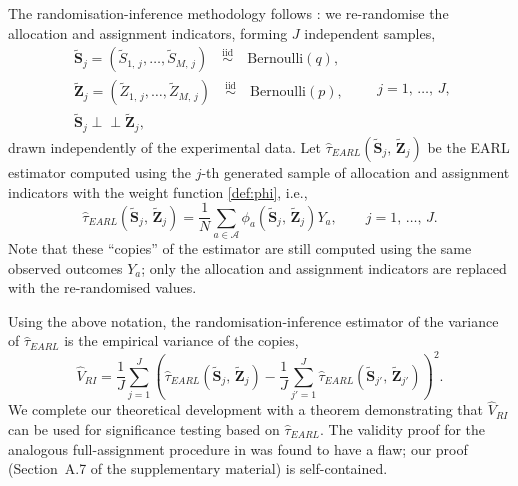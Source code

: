 \documentclass[sigconf,anonymous,review]{acmart}
\newcommand{\iidsim}{{\stackrel{\mathrm{iid}}{\sim}}}
\newcommand{\ind}{\perp\!\!\!\perp}
\begin{document}
The randomisation-inference methodology follows \cite[Section~4]{shi2025scalableanalysisbipartiteexperiments}: we re-randomise the allocation and assignment indicators, forming $J$ independent samples,
\begin{equation}\label{def:S-Z-samples}
    \begin{array}{c}
        \tilde{\mathbf{S}}_j = (\tilde S_{1,\,j},\ldots,\tilde S_{M,\,j}) \quad \iidsim \quad \mathrm{Bernoulli}(q),\\
        \tilde{\mathbf Z}_j = (\tilde Z_{1,\,j},\ldots,\tilde Z_{M,\,j}) \quad \iidsim \quad \mathrm{Bernoulli}(p),\\
        \tilde{\mathbf{S}}_j\ind \tilde{\mathbf Z}_j,
    \end{array}\qquad j=1,\,\ldots,\,J,
\end{equation}
drawn independently of the experimental data. Let $\hat\tau^{\phantom{1}}_{EARL}(\tilde {\mathbf S}_j,\,\tilde{\mathbf Z}_j)$ be the EARL estimator computed using the $j$-th generated sample of allocation and assignment indicators with the weight function \eqref{def:phi}, i.e.,
$$
    \hat\tau^{\phantom{1}}_{EARL}(\tilde {\mathbf S}_j,\,\tilde{\mathbf Z}_j) = \frac 1 N \sum_{a\in\mathcal{A}}\phi_a(\tilde {\mathbf S}_j,\,\tilde{\mathbf Z}_j)Y_a,\qquad j=1,\,\ldots,\,J.
$$
Note that these ``copies'' of the estimator are still computed using the same observed outcomes $Y_a$; only the allocation and assignment indicators are replaced with the re-randomised values.

Using the above notation, the randomisation-inference estimator of the variance of $\hat\tau^{\phantom{1}}_{EARL}$ is the empirical variance of the copies,
\begin{equation}\label{def:hatV}
    \hat V_{RI} = \frac{1}{J} \sum_{j=1}^J\left(\hat\tau^{\phantom{1}}_{EARL}(\tilde {\mathbf S}_j,\,\tilde{\mathbf Z}_j)-\frac 1 J\sum_{j'=1}^J\hat\tau^{\phantom{1}}_{EARL}(\tilde {\mathbf S}_{j'},\,\tilde{\mathbf Z}_{j'})\right)^2.
\end{equation}
We complete our theoretical development with a theorem demonstrating that $\hat V_{RI}$ can be used for significance testing based on $\hat\tau^{\phantom{1}}_{EARL}$. The validity proof for the analogous full-assignment procedure in \cite{shi2025scalableanalysisbipartiteexperiments} was found to have a flaw; our proof (Section~A.7 of the supplementary material) is self-contained.
\end{document}
